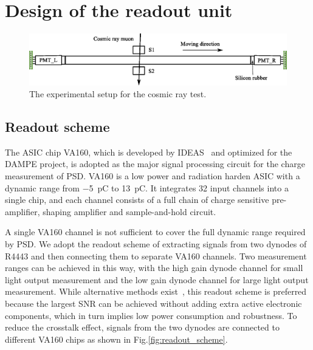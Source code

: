 \documentclass[5p, times]{elsarticle}
\begin{document}
\section{Design of the readout unit}
\label{sec:design}
\begin{figure}[b]
 \centering
 \includegraphics[width=130mm]{cosmic_test}
\caption{The experimental setup for the cosmic ray test.}
\label{fig:cosmic_test}
\end{figure} 

\subsection{Readout scheme}
\label{sec:scheme}
The ASIC chip VA160, which is developed by IDEAS~\cite{va160} and optimized for the DAMPE project, is adopted as the major signal processing circuit for the charge measurement of PSD.
VA160 is a low power and radiation harden ASIC with a dynamic range from \SI{-5}{\pico\coulomb} to \SI{13}{\pico\coulomb}. 
It integrates 32 input channels into a single chip, and each channel consists of a full chain of charge sensitive pre-amplifier, shaping amplifier and sample-and-hold circuit.

A single VA160 channel is not sufficient to cover the full dynamic range required by PSD.
We adopt the readout scheme of extracting signals from two dynodes of R4443 and then connecting them to separate VA160 channels.
Two measurement ranges can be achieved in this way, with the high gain dynode channel for small light output measurement and the low gain dynode channel for large light output measurement.
While alternative methods exist~\cite{katayose2008development,kampert1994high,genolini_low_2003}, this readout scheme is preferred because the largest SNR can be achieved without adding extra active electronic components, which in turn implies low power consumption and robustness.
To reduce the crosstalk effect, signals from the two dynodes are connected to different VA160 chips as shown in Fig.\ref{fig:readout_scheme}.
\end{document}
